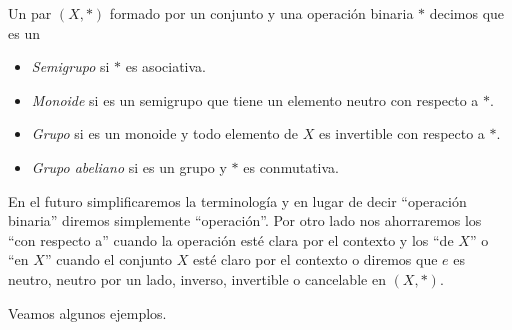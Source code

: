 Un par $(X,*)$ formado por un conjunto y una operación binaria $*$ decimos que es un
\begin{itemize}
    \item {\it Semigrupo} si $*$ es asociativa.
    \item {\it Monoide} si es un semigrupo que tiene un elemento neutro con respecto a $*$.
    \item {\it Grupo} si es un monoide y todo elemento de $X$ es invertible con respecto a $*$.
    \item {\it Grupo abeliano} si es un grupo y $*$ es conmutativa.
\end{itemize}

En el futuro simplificaremos la terminología y en lugar de decir ``operación binaria'' diremos simplemente ``operación''. Por otro lado nos ahorraremos los ``con respecto a'' cuando la operación esté clara por el contexto y los ``de $X$'' o ``en $X$'' cuando el conjunto $X$ esté claro por el contexto o diremos que $e$ es neutro, neutro por un lado, inverso, invertible o cancelable en $(X,*)$.

Veamos algunos ejemplos.

